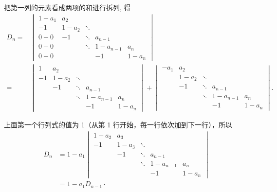 \begin{solution}
    把第一列的元素看成两项的和进行拆列, 得
    \begin{align*}
        D_n= & \begin{vmatrix}
                   1-a_{1} & a_{2}   &        &           &         \\
                   -1      & 1-a_{2} & \ddots &           &         \\
                   0 + 0   & -1      & \ddots & a_{n-1}   &         \\
                   0 + 0   &         & \ddots & 1-a_{n-1} & a_{n}   \\
                   0 + 0   &         &        & -1        & 1-a_{n}
               \end{vmatrix}                \\
        =    & \begin{vmatrix}
                   1  & a_{2}   &        &           &         \\
                   -1 & 1-a_{2} & \ddots &           &         \\
                      & -1      & \ddots & a_{n-1}   &         \\
                      &         & \ddots & 1-a_{n-1} & a_{n}   \\
                      &         &        & -1        & 1-a_{n}
               \end{vmatrix} + \begin{vmatrix}
                                   -a_{1} & a_{2}   &        &           &         \\
                                          & 1-a_{2} & \ddots &           &         \\
                                          & -1      & \ddots & a_{n-1}   &         \\
                                          &         & \ddots & 1-a_{n-1} & a_{n}   \\
                                          &         &        & -1        & 1-a_{n}
                               \end{vmatrix}.
    \end{align*}

    上面第一个行列式的值为 1（从第 1 行开始，每一行依次加到下一行），所以
    \[ \begin{aligned}
            D_n & =1-a_{1}\begin{vmatrix}
                              1-a_{2} & a_{3}   &        &           &         \\
                              -1      & 1-a_{3} & \ddots &           &         \\
                                      & -1      & \ddots & a_{n-1}   &         \\
                                      &         & \ddots & 1-a_{n-1} & a_{n}   \\
                                      &         &        & -1        & 1-a_{n}
                          \end{vmatrix} \\
                & =1-a_{1} D_{n-1} \cdot
        \end{aligned} \]


\end{solution}
